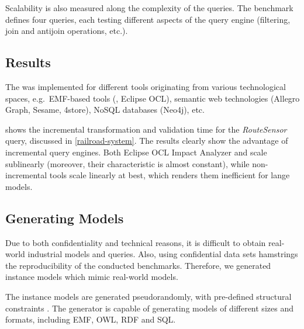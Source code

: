 Scalability is also measured along the complexity of the queries. The benchmark defines four queries, each testing different aspects of the query engine (filtering, join and antijoin operations, etc.).

\subsection{Results}

The \tb{} was implemented for different tools originating from various technological spaces, e.g.\ EMF-based tools (\eiq{}, Eclipse OCL), semantic web technologies (Allegro Graph, Sesame, 4store), NoSQL databases (Neo4j), etc.


 shows the incremental transformation and validation time for the \emph{RouteSensor} query, discussed in \autoref{railroad-system}. The results clearly show the advantage of incremental query engines. Both Eclipse OCL Impact Analyzer and \eiq{} scale sublinearly (moreover, their characteristic is almost constant), while non-incremental tools scale linearly at best, which renders them inefficient for lange models.

\subsection{Generating Models}
\label{trainbenchmark-model-generation}

Due to both confidentiality and technical reasons, it is difficult to obtain real-world industrial models and queries. Also, using confidential data sets hamstrings the reproducibility of the conducted benchmarks. Therefore, we generated instance models which mimic real-world models.

The instance models are generated pseudorandomly, with pre-defined structural constraints \cite{ASE2013}. The generator is capable of generating models of different sizes and formats, including EMF, OWL, RDF and SQL. 
